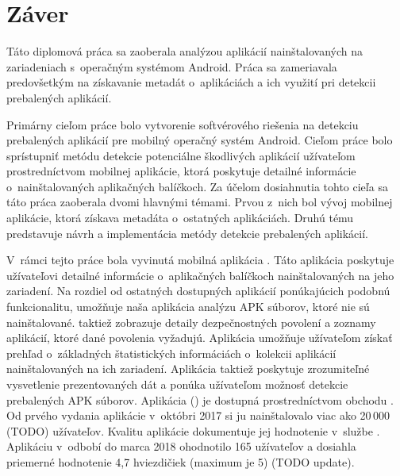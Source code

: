 \chapter*{Záver}
Táto diplomová práca sa zaoberala analýzou aplikácií nainštalovaných na zariadeniach s~operačným systémom Android. Práca sa zameriavala predovšetkým na získavanie metadát o~aplikáciách a ich využití pri detekcii prebalených aplikácií.

Primárny cieľom práce bolo vytvorenie softvérového riešenia na detekciu prebalených aplikácií pre mobilný operačný systém Android. Cieľom práce bolo sprístupniť metódu detekcie potenciálne škodlivých aplikácií užívateľom prostredníctvom mobilnej aplikácie, ktorá poskytuje detailné informácie o~nainštalovaných aplikačných balíčkoch.  
Za účelom dosiahnutia tohto cieľa sa táto práca zaoberala dvomi hlavnými témami. Prvou z~nich bol vývoj mobilnej aplikácie, ktorá získava metadáta o~ostatných aplikáciách. Druhú tému predstavuje návrh a implementácia metódy detekcie prebalených aplikácií. 

V~rámci tejto práce bola vyvinutá mobilná aplikácia . Táto aplikácia poskytuje užívateľovi detailné informácie o~aplikačných balíčkoch nainštalovaných na jeho zariadení. Na rozdiel od ostatných dostupných aplikácií ponúkajúcich podobnú funkcionalitu, umožňuje naša aplikácia analýzu APK súborov, ktoré nie sú nainštalované. taktiež zobrazuje detaily dezpečnostných povolení a zoznamy aplikácií, ktoré dané povolenia vyžadujú. Aplikácia umožňuje užívateľom získať prehľad o~základných štatistických informáciách o~kolekcii aplikácií nainštalovaných na ich zariadení. Aplikácia taktiež poskytuje zrozumiteľné vysvetlenie prezentovaných dát a ponúka užívateľom možnosť detekcie prebalených APK súborov.  Aplikácia  () je dostupná prostredníctvom obchodu . Od prvého vydania aplikácie v~októbri 2017 si ju nainštalovalo viac ako 20\,000 (TODO) užívateľov. Kvalitu aplikácie dokumentuje jej hodnotenie v~službe . Aplikáciu v~odbobí do marca 2018 ohodnotilo 165 užívateľov a dosiahla priemerné hodnotenie 4,7 hviezdičiek (maximum je 5) (TODO update).

